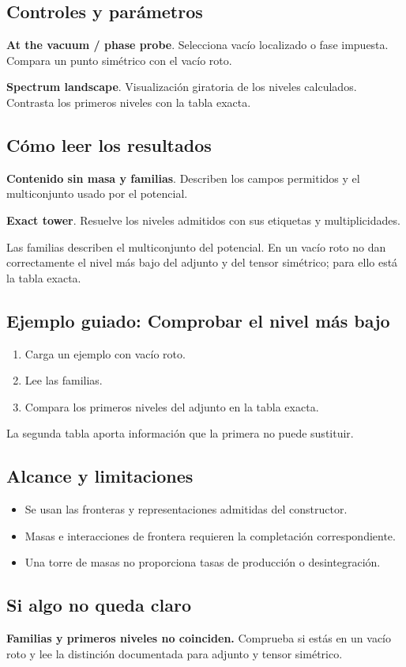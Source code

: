 \documentclass[11pt,a4paper]{article}
\begin{document}
\subsection*{Controles y parámetros}
\textbf{At the vacuum / phase probe}. Selecciona vacío localizado o fase impuesta. Compara un punto simétrico con el vacío roto.

\textbf{Spectrum landscape}. Visualización giratoria de los niveles calculados. Contrasta los primeros niveles con la tabla exacta.

\subsection*{Cómo leer los resultados}
\textbf{Contenido sin masa y familias}. Describen los campos permitidos y el multiconjunto usado por el potencial.

\textbf{Exact tower}. Resuelve los niveles admitidos con sus etiquetas y multiplicidades.

Las familias describen el multiconjunto del potencial. En un vacío roto no dan correctamente el nivel más bajo del adjunto y del tensor simétrico; para ello está la tabla exacta.
\subsection*{Ejemplo guiado: Comprobar el nivel más bajo}
\begin{enumerate}
\item Carga un ejemplo con vacío roto.
\item Lee las familias.
\item Compara los primeros niveles del adjunto en la tabla exacta.
\end{enumerate}
La segunda tabla aporta información que la primera no puede sustituir.
\subsection*{Alcance y limitaciones}
\begin{itemize}
\item Se usan las fronteras y representaciones admitidas del constructor.
\item Masas e interacciones de frontera requieren la completación correspondiente.
\item Una torre de masas no proporciona tasas de producción o desintegración.
\end{itemize}
\subsection*{Si algo no queda claro}
\textbf{Familias y primeros niveles no coinciden.} Comprueba si estás en un vacío roto y lee la distinción documentada para adjunto y tensor simétrico.
\end{document}

